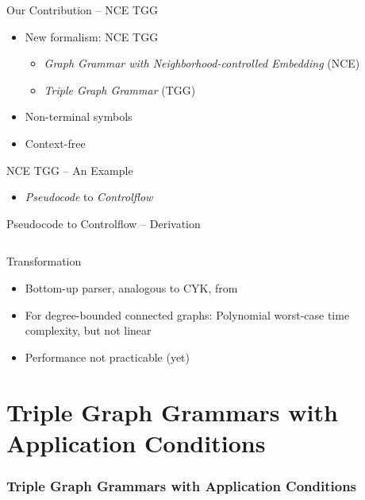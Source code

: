 \documentclass[usenames,dvipsnames]{beamer}
\begin{document}
	\begin{frame}{Our Contribution -- NCE TGG}
		\begin{itemize}
			\item New formalism: NCE TGG
			\begin{itemize}
				\item \emph{Graph Grammar with Neighborhood-controlled Embedding} (NCE) \cite{janssens1982graph}
				\item \emph{Triple Graph Grammar} (TGG) \cite{schurr1994specification}
			\end{itemize}
			\item Non-terminal symbols
			\item Context-free
		\end{itemize}
	\end{frame}
	
	\begin{frame}{NCE TGG -- An Example}
		\begin{itemize}
			\item \emph{Pseudocode} to \emph{Controlflow}
		\end{itemize}
		
		
	\end{frame}
	
	\begin{frame}{Pseudocode to Controlflow -- Derivation}
		\begin{columns}
			\column{\dimexpr\paperwidth-30pt}
			
		\end{columns}
	\end{frame}
	
	\begin{frame}{Transformation}
		\pause
		
		\vskip 10pt
		\pause
		\begin{itemize}
			\item Bottom-up parser, analogous to CYK, from \cite{rozenberg1986boundary}
			\item For degree-bounded connected graphs: Polynomial worst-case time complexity, but not linear
			\item Performance not practicable (yet)
		\end{itemize}
	\end{frame}
	
	\section{Triple Graph Grammars with Application Conditions}
	\begin{frame}
		\frametitle{Triple Graph Grammars with Application Conditions}
	\end{frame}
	
\end{document}
